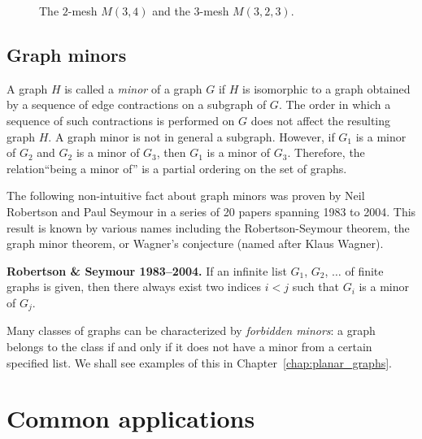 \begin{figure}[!htbp]
\centering

\caption{The $2$-mesh $M(3, 4)$ and the $3$-mesh $M(3, 2, 3)$.}
\label{fig:introduction:mesh_grid_lattice}
\end{figure}



\subsection{Graph minors}

A graph $H$ is called a \emph{minor} of a graph $G$ if $H$ is
isomorphic to a graph obtained by a sequence of edge contractions on a
subgraph of $G$.  The order in which a sequence of such contractions is
performed on $G$ does not affect the resulting graph $H$. A graph
minor is not in general a subgraph. However, if $G_1$ is a minor of
$G_2$ and $G_2$ is a minor of $G_3$, then $G_1$ is a minor of
$G_3$. Therefore, the relation``being a minor of'' is a partial
ordering on the set of graphs.

The following non-intuitive fact about graph minors was proven by
Neil Robertson and Paul Seymour in a series of 20 papers spanning 1983
to 2004. This result is known by various names including the
Robertson-Seymour theorem, the graph minor theorem, or Wagner's
conjecture (named after Klaus Wagner).

\begin{theorem}
\label{thm:introduction:graph_minor}
\textbf{Robertson \& Seymour 1983--2004.}
If an infinite list $G_1$, $G_2$, $\dots$ of finite graphs is given,
then there always exist two indices $i < j$ such that $G_i$ is a minor
of $G_j$.
\end{theorem}

Many classes of graphs can be characterized by
\emph{forbidden minors}: a graph belongs to the class if and only if
it does not have a minor from a certain specified list. We shall see
examples of this in Chapter~\ref{chap:planar_graphs}.



\section{Common applications}


